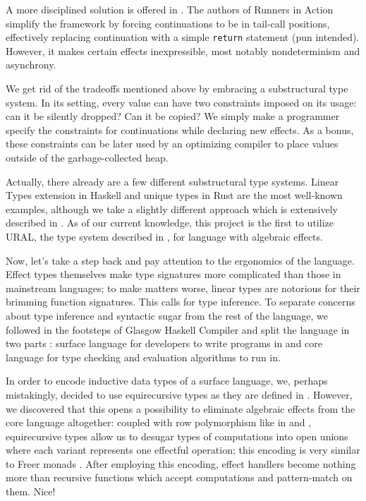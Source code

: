 \documentclass[a4paper,14pt]{extreport}
\begin{document}
A more disciplined solution is offered in \cite{bauer}. The authors of Runners
in Action simplify the framework by forcing continuations to be in tail-call
positions, effectively replacing continuation with a simple \verb|return|
statement (pun intended). However, it makes certain effects inexpressible, most
notably nondeterminism and asynchrony.

We get rid of the tradeoffs mentioned above by embracing a substructural type
system. In its setting, every value can have two constraints imposed on its
usage: can it be silently dropped? Can it be copied? We simply make a programmer
specify the constraints for continuations while declaring new effects. As a
bonus, these constraints can be later used by an optimizing compiler to place
values outside of the garbage-collected heap.

Actually, there already are a few different substructural type systems.
Linear Types extension in Haskell \cite{linear} and unique types in Rust
\cite{rust} are the most well-known examples, although we take a slightly
different approach which is extensively described in \cite{ural}. As of our
current knowledge, this project is the first to utilize URAL, the type system
described in \cite{ural}, for language with algebraic effects.

Now, let's take a step back and pay attention to the ergonomics of the language.
Effect types themselves make type signatures more complicated than those in
mainstream languages; to make matters worse, linear types are notorious for
their brimming function signatures. This calls for type inference. To separate
concerns about type inference and syntactic sugar from the rest of the language,
we followed in the footsteps of Glasgow Haskell Compiler and split the language
in two parts \cite{ghc}: surface language for developers to write programs in
and core language for type checking and evaluation algorithms to run in.

In order to encode inductive data types of a surface language, we, perhaps
mistakingly, decided to use equirecursive types as they are defined in
\cite{stone}. However, we discovered that this opens a possibility to eliminate
algebraic effects from the core language altogether: coupled with row
polymorphism like in \cite{rowkoka} and \cite{rowcaml}, equirecursive types
allow us to desugar types of computations into open unions where each variant
represents one effectful operation; this encoding is very similar to Freer
monads \cite{exteff}. After employing this encoding, effect handlers become
nothing more than recursive functions which accept computations and
pattern-match on them. Nice!
\end{document}

